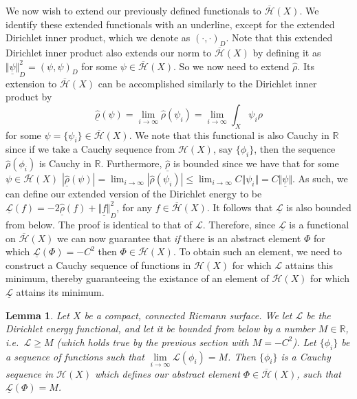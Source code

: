 \documentclass[11pt]{report}
\newtheorem{lemma}[thm]{Lemma}
\theoremstyle{definition}
\begin{document}
We now wish to extend our previously defined functionals to $\overline{\mathcal{H}}(X)$. We identify these extended functionals with an underline, except for the extended Dirichlet inner product, which we denote as $(\cdot, \cdot)_D$. Note that this extended Dirichlet inner product also extends our norm to $\overline{\mathcal{H}}(X)$ by defining it as $\underline{\Vert\psi\Vert}_D^2 = (\psi, \psi)_D$ for some $\psi \in \overline{\mathcal{H}}(X)$.
So we now need to extend $\hat{\rho}$. Its extension to $\overline{\mathcal{H}}(X)$ can be accomplished similarly to the Dirichlet inner product by
\[\underline{\hat{\rho}}(\psi) = \lim_{i \rightarrow \infty} \hat{\rho}(\psi_i) = \lim_{i \rightarrow \infty} \int_X \psi_i\rho\]
for some $\psi = \{\psi_i\} \in \overline{\mathcal{H}}(X)$. We note that this functional is also Cauchy in $\mathbb{R}$ since if we take a Cauchy sequence from $\mathcal{H}(X)$, say $\{\phi_i\}$, then the sequence $\hat{\rho}(\phi_i)$ is Cauchy in $\mathbb{R}$. Furthermore, $\underline{\hat{\rho}}$ is bounded since we have that for some $\psi \in \overline{\mathcal{H}}(X)$ $|\underline{\hat{\rho}}(\psi)| = \lim_{i \rightarrow \infty}|\hat{\rho}(\psi_i)| \leq \lim_{i \rightarrow \infty}C\Vert \psi_i \Vert = C\underline{\Vert \psi\Vert}$.
As such, we can define our extended version of the Dirichlet energy to be
$\underline{\mathcal{L}}(f) =  -2\underline{\hat{\rho}}(f) + \underline{\Vert f \Vert}_D^2$, for any $f \in \overline{\mathcal{H}}(X)$. It follows that $\underline{\mathcal{L}}$ is also bounded from below. The proof is identical to that of $\mathcal{L}$. Therefore, since $\underline{\mathcal{L}}$ is a functional on $\overline{\mathcal{H}}(X)$ we can now guarantee that \emph{if} there is an abstract element $\Phi$ for which $\underline{\mathcal{L}}(\Phi) = -C^2$ then $\Phi \in \overline{\mathcal{H}}(X)$. To obtain such an element, we need to construct a Cauchy sequence of functions in $\mathcal{H}(X)$ for which $\mathcal{L}$ attains this minimum, thereby guaranteeing the existance of an element of $\overline{\mathcal{H}}(X)$ for which $\underline{\mathcal{L}}$ attains its minimum.
\begin{lemma}
  Let $X$ be a compact, connected Riemann surface. We let $\mathcal{L}$ be the Dirichlet energy functional, and let it be bounded from below by a number $M \in \mathbb{R}$, i.e.\ $\mathcal{L} \geq M$ (which holds true by the previous section with $M=-C^2$).
  Let $\{\phi_i\}$ be a sequence of functions such that $\lim\limits_{i \rightarrow \infty}\mathcal{L}(\phi_i) = M$. Then $\{\phi_i\}$ is a Cauchy sequence in $\mathcal{H}(X)$ which defines our abstract element $\Phi \in \overline{\mathcal{H}}(X)$, such that $\underline{\mathcal{L}}(\Phi) = M$.
\end{lemma}
\end{document}
